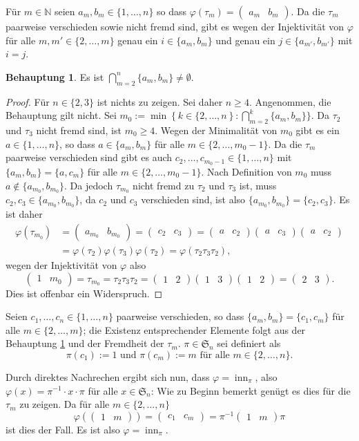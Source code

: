 \documentclass[a4paper,10pt]{article}
\theoremstyle{definition}
\newtheorem{beh}{Behauptung}
\newcommand{\N}{\mathbb{N}}
\newcommand{\Sn}{\mathfrak{S}}
\newcommand{\inn}{\operatorname{inn}}
\newcommand{\vect}[1]{\begin{pmatrix}#1\end{pmatrix}}
\begin{document}
Für $m \in \N$ seien $a_m, b_m \in \{1,\ldots,n\}$ so dass $\varphi(\tau_m) = \vect{a_m & b_m}$. Da die $\tau_m$ paarweise verschieden sowie nicht fremd sind, gibt es wegen der Injektivität von $\varphi$ für alle $m, m' \in \{2, \ldots, m\}$ genau ein $i \in \{a_m, b_m\}$ und genau ein $j \in \{a_{m'}, b_{m'}\}$ mit $i = j$.

\begin{beh}\label{beh: transpositionen gemeinsames element}
 Es ist $\bigcap_{m=2}^n \{a_m, b_m\} \neq \emptyset$.
\end{beh}
\begin{proof}
 Für $n \in \{2,3\}$ ist nichts zu zeigen. Sei daher $n \geq 4$. Angenommen, die Behauptung gilt nicht. Sei $m_0 := \min \left\{k \in \{2,\ldots,n\right\} : \bigcap_{m=2}^k \{a_m,b_m\}\}$. Da $\tau_2$ und $\tau_3$ nicht fremd sind, ist $m_0 \geq 4$. Wegen der Minimalität von $m_0$ gibt es ein \mbox{$a \in \{1,\ldots,n\}$}, so dass $a \in \{a_m,b_m\}$ für alle $m \in \{2,\ldots,m_0-1\}$. Da die $\tau_m$ paarweise verschieden sind gibt es auch $c_2, \ldots, c_{m_0-1} \in \{1,\ldots,n\}$ mit $\{a_m, b_m\} = \{a, c_m\}$ für alle $m \in \{2, \ldots, m_0 -1\}$. Nach Definition von $m_0$ muss $a \not \in \{a_{m_0}, b_{m_0}\}$. Da jedoch $\tau_{m_0}$ nicht fremd zu $\tau_2$ und $\tau_3$ ist, muss $c_2, c_3 \in \{a_{m_0},b_{m_0}\}$, da $c_2$ und $c_3$ verschieden sind, ist also $\{a_{m_0}, b_{m_0}\} = \{c_2, c_3\}$.
 Es ist daher
 \begin{align*}
  \varphi(\tau_{m_0})
  &= \vect{a_{m_0} &  b_{m_0}} = \vect{c_2 & c_3} = \vect{a & c_2} \vect{a & c_3} \vect{a & c_2} \\
  &= \varphi(\tau_2)\varphi(\tau_3)\varphi(\tau_2) = \varphi(\tau_2 \tau_3 \tau_2),
 \end{align*}
 wegen der Injektivität von $\varphi$ also
 \[
  \vect{1 & m_0} = \tau_{m_0} = \tau_2 \tau_3 \tau_2 = \vect{1 & 2} \vect{1 & 3} \vect{1 & 2} = \vect{2 & 3}.
 \]
 Dies ist offenbar ein Widerspruch.
\end{proof}

Seien $c_1, \ldots, c_n \in \{1,\ldots,n\}$ paarweise verschieden, so dass $\{a_m, b_m\} = \{c_1, c_m\}$ für alle $m \in \{2,\ldots,m\}$; die Existenz entsprechender Elemente folgt aus der Behauptung \ref{beh: transpositionen gemeinsames element} und der Fremdheit der $\tau_m$. $\pi \in \Sn_n$ sei definiert als
\[
 \pi(c_1) := 1 \text{ und } \pi(c_m) := m \text{ für alle } m \in \{2,\ldots,n\}.
\]

Durch direktes Nachrechen ergibt sich nun, dass $\varphi = \inn_\pi$, also $\varphi(x) = \pi^{-1} \cdot x \cdot \pi$ für alle $x \in \Sn_n$: Wie zu Beginn bemerkt genügt es dies für die $\tau_m$ zu zeigen. Da für alle $m \in \{2, \ldots, n\}$
\[
 \varphi(\vect{1 & m}) = \vect{c_1 & c_m} = \pi^{-1} \vect{1 & m} \pi
\]
ist dies der Fall. Es ist also $\varphi = \inn_\pi$.
\end{document}
